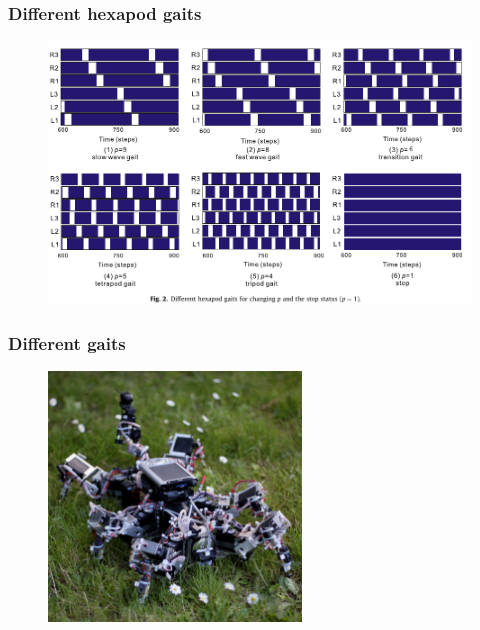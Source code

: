 \documentclass{beamer}
\begin{document}
\begin{frame}
\frametitle{Different hexapod gaits}
\begin{figure}
\center
\includegraphics[width=1\textwidth]{figs/different-hexapod-gaits-c.pdf}
\end{figure}
\end{frame}

\begin{frame}
\frametitle{Different gaits}
\begin{figure}
\center
\href{run:figs/videos/nphys1508-s3.mpg}{\includegraphics[width=0.6\textwidth]{figs/AMOS_3.jpg}}
\end{figure}
\end{frame}
\end{document}
